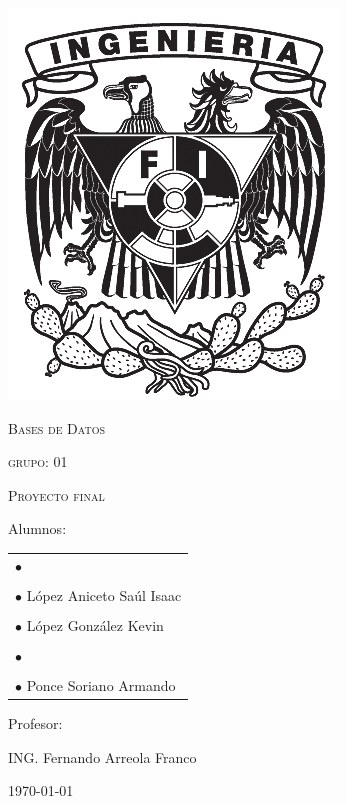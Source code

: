 \documentclass[12pt,letterpaper]{article}
\begin{document}
\begin{titlepage}
\begin{minipage}{0.14\linewidth}
			\includegraphics[width=\linewidth]{img/shieldFi}
		\end{minipage}
		
		\centering
		\vspace{1.5cm}
		{\scshape\Large Bases de Datos \par}
		{\scshape\Large grupo: 01\par}
		\vspace{3cm}
		{\scshape\Huge Proyecto final \par}
		\vspace{0.8cm}
		\vfill
		{\Large Alumnos: \par}
		\begin{center}
			\begin{tabular}{l}
				$\bullet$ \\
				\\
				$\bullet$ {\Large López Aniceto Saúl Isaac }\\
				\\
				$\bullet$ {\Large López González Kevin } \\
				\\
				$\bullet$ \\
				\\
				$\bullet$ {\Large Ponce Soriano Armando }\\
			\end{tabular}
		\end{center}
		\vfill
		{\Large Profesor: \par}
		{\Large ING. Fernando Arreola Franco \par}
		\vfill
		{\Large \today \par}
	\end{titlepage}
\end{document}
